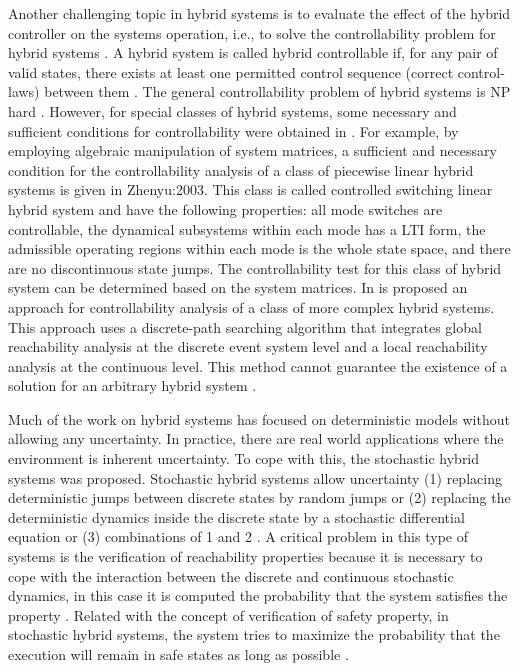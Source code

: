 Another challenging topic in hybrid systems is to evaluate the effect of the hybrid controller on the systems operation, i.e., to solve the controllability problem for hybrid systems \cite{Stikkel:2004}. A hybrid system is called hybrid controllable if, for any pair of valid states, there exists at least one permitted control sequence (correct control-laws) between them \cite{Tittus:1998,Yang:2007}. The general controllability problem of hybrid systems is NP hard \cite{Blondel:1999}. However, for special classes of hybrid systems, some necessary and sufficient conditions for controllability were obtained in \cite{Stikkel:2004,Lemch:2001,Sun:2002,Zhenyu:2003,Yang:2007}.
For example, by employing algebraic manipulation of system matrices, a sufficient and necessary condition for the controllability analysis of a class of  piecewise linear hybrid systems is given in {Zhenyu:2003}. This class is called controlled switching linear hybrid system and have the following properties: all mode switches are controllable, the dynamical subsystems within each mode has a LTI form, the admissible operating regions within each mode is the whole state space, and there are no discontinuous state jumps. The controllability test for this class of hybrid system can be determined based on the system matrices. In \cite{Yang:2007} is proposed an approach for controllability analysis of a class of more complex hybrid systems. This approach uses a discrete-path searching algorithm that integrates global reachability analysis at the discrete event system level and a local reachability analysis at the continuous level. This method cannot guarantee the existence of a solution for an arbitrary hybrid system \cite{Yang:2007}.

Much of the work on hybrid systems has focused on deterministic models without allowing any uncertainty. In practice, there are real world applications where the environment is inherent uncertainty. To cope with this, the stochastic hybrid systems was proposed. Stochastic hybrid systems allow uncertainty (1) replacing deterministic jumps between discrete states by random jumps or (2) replacing the deterministic dynamics inside the discrete state by a stochastic differential equation or (3) combinations of 1 and 2 \cite{Hu:2000}. A critical problem in this type of systems is the verification of reachability properties because it is necessary to cope with the interaction between the discrete and continuous stochastic dynamics, in this case it is computed the probability that the system satisfies the property \cite{Koutsoukos:2006}.  Related with the concept of verification of safety property, in stochastic hybrid systems, the system tries to maximize the probability that the execution will remain in safe states as long as possible \cite{Hu:2000}.


